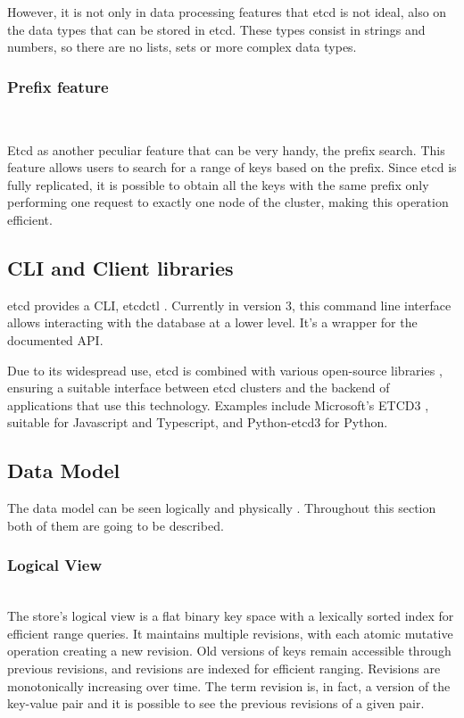 \documentclass[screen,review]{acmart}
\begin{document}
However, it is not only in data processing features that etcd is not ideal, also on the data types that can be stored in etcd. These types consist in strings and numbers, so there are no lists, sets or more complex data types. \\

\subsubsection{Prefix feature}~\

Etcd as another peculiar feature that can be very handy, the prefix search. This feature allows users to search for a range of keys based on the prefix. Since etcd is fully replicated, it is possible to obtain all the keys with the same prefix only performing one request to exactly one node of the cluster, making this operation efficient.

\subsection{CLI and Client libraries}

etcd provides a CLI, etcdctl \cite{etcd_clt}. Currently in version 3, this command line interface allows interacting with the database at a lower level. It's a wrapper for the documented API.

Due to its widespread use, etcd is combined with various open-source libraries \cite{etcd_library}, ensuring a suitable interface between etcd clusters and the backend of applications that use this technology. Examples include Microsoft's ETCD3 \cite{etcd_microsoft}, suitable for Javascript and Typescript, and Python-etcd3 \cite{etcd_python} for Python.

\subsection{Data Model}
The data model can be seen logically and physically \cite{etcd_data_model}. Throughout this section both of them are going to be described. \\

\subsubsection{Logical View}~\\
The store's logical view is a flat binary key space with a lexically sorted index for efficient range queries. It maintains multiple revisions, with each atomic mutative operation creating a new revision. Old versions of keys remain accessible through previous revisions, and revisions are indexed for efficient ranging. Revisions are monotonically increasing over time. The term revision is, in fact, a version of the key-value pair and it is possible to see the previous revisions of a given pair.
\end{document}
